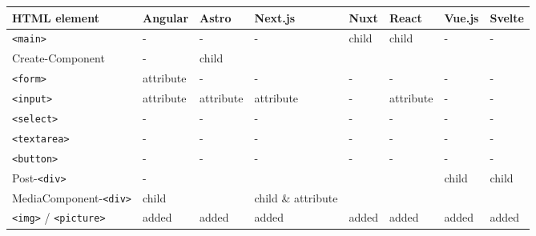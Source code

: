 \documentclass[a4paper, 10pt]{article}
\begin{document}
\begin{table}[!ht]
  \centering
  \begin{adjustbox}{angle=90}
    \begin{tabular}{|l|l|l|l|l|l|l|l|}
      \hline
      \textbf{HTML element}           & \textbf{Angular}  & \textbf{Astro}  & \textbf{Next.js}    & \textbf{Nuxt} & \textbf{React}  & \textbf{Vue.js} & \textbf{Svelte} \\ \hline
      \verb|<main>|                   & -                 & -               & -                   & child         & child           & -               & -               \\ \hline
      Create-Component                & -                 & child           & ~                   & ~             & ~               & ~               & ~               \\ \hline
      \verb|<form>|                   & attribute         & -               & -                   & -             & -               & -               & -               \\ \hline
      \verb|<input>|                  & attribute         & attribute       & attribute           & -             & attribute       & -               & -               \\ \hline
      \verb|<select>|                 & -                 & -               & -                   & -             & -               & -               & -               \\ \hline
      \verb|<textarea>|               & -                 & -               & -                   & -             & -               & -               & -               \\ \hline
      \verb|<button>|                 & -                 & -               & -                   & -             & -               & -               & -               \\ \hline
      Post-\verb|<div>|               & -                 & ~               & ~                   & ~             & ~               & child           & child           \\ \hline
      MediaComponent-\verb|<div>|     & child             & ~               & child \& attribute  & ~             & ~               & ~               & ~               \\ \hline
      \verb|<img>| / \verb|<picture>| & added             & added           & added               & added         & added           & added           & added           \\ \hline

\end{tabular}
\end{adjustbox}
\end{table}
\end{document}
